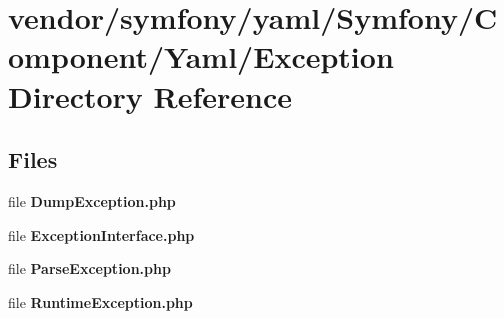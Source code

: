 \section{vendor/symfony/yaml/\+Symfony/\+Component/\+Yaml/\+Exception Directory Reference}
\label{dir_e09d08481a4da0e5b1b19399e65abc41}
\subsection*{Files}
\begin{DoxyCompactItemize}
\item 
file {\bf Dump\+Exception.\+php}
\item 
file {\bf Exception\+Interface.\+php}
\item 
file {\bf Parse\+Exception.\+php}
\item 
file {\bf Runtime\+Exception.\+php}
\end{DoxyCompactItemize}
